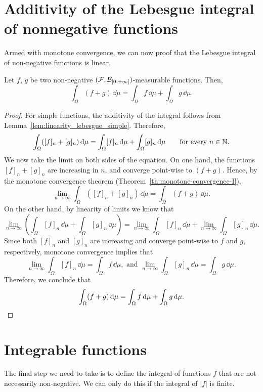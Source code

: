 \section{Additivity of the Lebesgue integral of nonnegative functions}

Armed with monotone convergence, we can now proof that the Lebesgue integral of non-negative functions is linear.

\begin{lemma}
	\label{pr:additivity-integral-nonneg}
	Let $f$, $g$ be two non-negative $(\mathcal F,\mathcal B_{[0,+\infty]})$-measurable functions. Then,
	\[
		\int_\Omega (f + g)\, \dd \mu = \int_\Omega f\, \dd \mu + \int_\Omega g\, \dd \mu.
	\]	
\end{lemma}
\begin{proof}
	For simple functions, the additivity of the integral follows from Lemma~\ref{lem:linearity_lebesgue_simple}. Therefore, 
	\[
	\int_\Omega ([f]_n + [g]_n)\, \mathrm{d} \mu = \int_\Omega [f]_n\, \mathrm{d} \mu + \int_\Omega [g]_n\, \mathrm{d} \mu\qquad\text{for every $n \in \mathbb N$.}
	\]
	We now take the limit on both sides of the equation. On one hand, the functions $[f]_n + [g]_n$ are increasing in $n$, and converge point-wise to $(f + g)$. Hence, by the monotone convergence theorem (Theorem~\ref{th:monotone-convergence-I}),
	\[
	\lim_{n \to \infty} \int_\Omega ([f]_n + [g]_n)\, \dd \mu = 
	\int_\Omega ( f + g)\, \dd \mu.
	\]
	On the other hand, by linearity of limits we know that 
	\[
	\lim_{n \to \infty} \left( \int_\Omega [f]_n\, \dd \mu + \int_\Omega [g]_n\, \dd \mu \right) 
		= \lim_{n \to \infty} \int_\Omega [f]_n\, \dd \mu + \lim_{n \to \infty} \int_\Omega [g]_n\, \dd \mu.
	\]
	Since both $[f]_n$ and $[g]_n$ are increasing and converge point-wise to $f$ and $g$, respectively, monotone convergence implies that
	\[
		\lim_{n \to \infty} \int_\Omega [f]_n\, \dd \mu = \int_\Omega f\, \dd \mu, \text{ and }
		\lim_{n \to \infty} \int_\Omega [g]_n\, \dd \mu = \int_\Omega g\, \dd \mu.
	\]
	Therefore, we conclude that
	\[
	\int_\Omega (f + g)\, \mathrm{d} \mu = \int_\Omega f\, \mathrm{d} \mu + \int_\Omega g\, \mathrm{d} \mu.\qedhere
	\]
\end{proof}


\section{Integrable functions}\label{sec:integrable}

The final step we need to take is to define the integral of functions $f$ that are not necessarily non-negative. We can only do this if the integral of $|f|$ is finite.

